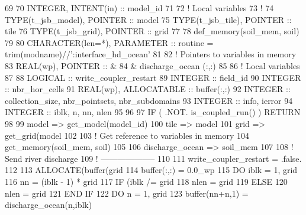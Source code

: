 \begin{DoxyCode}
69 
70     \textcolor{keywordtype}{INTEGER}, \textcolor{keywordtype}{INTENT(in)} :: model\_id
71 
72     \textcolor{comment}{! Local variables}
73     \textcolor{comment}{!}
74     \textcolor{keywordtype}{TYPE}(t\_jsb\_model), \textcolor{keywordtype}{POINTER}    :: model
75     \textcolor{keywordtype}{TYPE}(t\_jsb\_tile),  \textcolor{keywordtype}{POINTER}    :: tile
76     \textcolor{keywordtype}{TYPE}(t\_jsb\_grid),  \textcolor{keywordtype}{POINTER}    :: grid
77 
78     def\_memory(soil\_mem, soil)
79 
80     \textcolor{keywordtype}{CHARACTER(len=*)},  \textcolor{keywordtype}{PARAMETER}  :: routine = trim(modname)//\textcolor{stringliteral}{':interface\_hd\_ocean'}
81 
82     \textcolor{comment}{! Pointers to variables in memory}
83     \textcolor{keywordtype}{REAL(wp)}, \textcolor{keywordtype}{POINTER} :: &
84       & discharge\_ocean   (:,:)
85 
86     \textcolor{comment}{! Local variables}
87 
88     \textcolor{keywordtype}{LOGICAL}               :: write\_coupler\_restart
89     \textcolor{keywordtype}{INTEGER}               :: field\_id
90     \textcolor{keywordtype}{INTEGER}               :: nbr\_hor\_cells
91     \textcolor{keywordtype}{REAL(wp)}, \textcolor{keywordtype}{ALLOCATABLE} :: buffer(:,:)
92     \textcolor{keywordtype}{INTEGER}               :: collection\_size, nbr\_pointsets, nbr\_subdomains
93     \textcolor{keywordtype}{INTEGER}               :: info, ierror
94     \textcolor{keywordtype}{INTEGER}               :: iblk, n, nn, nlen
95 
96 
97     \textcolor{keywordflow}{IF} ( .NOT. is\_coupled\_run() ) \textcolor{keywordflow}{RETURN}
98 
99     model => get\_model(model\_id)
100     tile => model%
101     grid => get\_grid(model%
102 
103     \textcolor{comment}{! Get reference to variables in memory}
104     get\_memory(soil\_mem, soil)
105 
106     discharge\_ocean => soil\_mem %
107 
108     \textcolor{comment}{! Send river discharge}
109     \textcolor{comment}{! --------------------}
110 
111     write\_coupler\_restart = .false.
112 
113     \textcolor{keyword}{ALLOCATE}(buffer(grid%
114     buffer(:,:) = 0.0\_wp
115     \textcolor{keywordflow}{DO} iblk = 1, grid%
116       nn = (iblk - 1) * grid%
117       \textcolor{keywordflow}{IF} (iblk /= grid%
118         nlen = grid%
119       \textcolor{keywordflow}{ELSE}
120         nlen = grid%
121 \textcolor{keywordflow}{      END IF}
122       \textcolor{keywordflow}{DO} n = 1, grid%
123         buffer(nn+n,1) = discharge\_ocean(n,iblk)

\end{DoxyCode}
